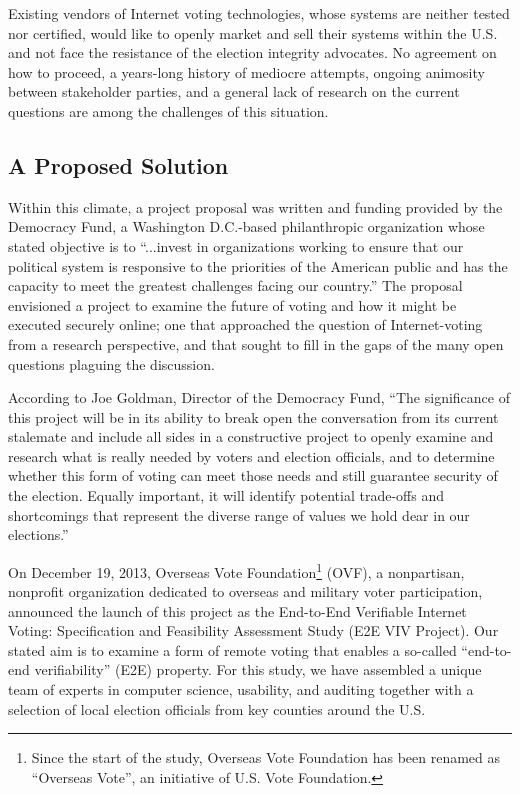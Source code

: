 Existing vendors of Internet voting technologies, whose systems are
neither tested nor certified, would like to openly market and sell
their systems within the U.S. and not face the resistance of the
election integrity advocates. No agreement on how to proceed, a
years-long history of mediocre attempts, ongoing animosity between
stakeholder parties, and a general lack of research on the current
questions are among the challenges of this situation.

\subsection{A Proposed Solution}
\label{sec:proposed-solution}

Within this climate, a project proposal was written and funding
provided by the Democracy Fund, a Washington D.C.-based philanthropic
organization whose stated objective is to “...invest in organizations
working to ensure that our political system is responsive to the
priorities of the American public and has the capacity to meet the
greatest challenges facing our country.” The proposal envisioned a
project to examine the future of voting and how it might be executed
securely online; one that approached the question of Internet-voting
from a research perspective, and that sought to fill in the gaps of
the many open questions plaguing the discussion.

According to Joe Goldman, Director of the Democracy Fund, “The
significance of this project will be in its ability to break open the
conversation from its current stalemate and include all sides in a
constructive project to openly examine and research what is really
needed by voters and election officials, and to determine whether this
form of voting can meet those needs and still guarantee security of
the election. Equally important, it will identify potential trade-offs
and shortcomings that represent the diverse range of values we hold
dear in our elections.”

On December 19, 2013, Overseas Vote Foundation\footnote{Since the
  start of the study, Overseas Vote Foundation has been renamed as
  “Overseas Vote”, an initiative of U.S. Vote Foundation.} (OVF), a
nonpartisan, nonprofit organization dedicated to overseas and military
voter participation, announced the launch of this project as the
End-to-End Verifiable Internet Voting: Specification and Feasibility
Assessment Study (E2E VIV Project). Our stated aim is to examine a
form of remote voting that enables a so-called “end-to-end
verifiability” (E2E) property. For this study, we have assembled a
unique team of experts in computer science, usability, and auditing
together with a selection of local election officials from key
counties around the U.S.

